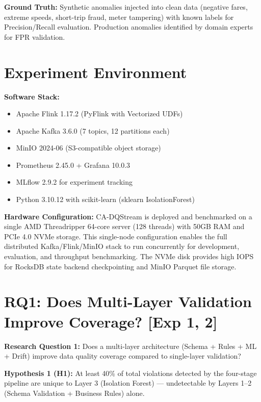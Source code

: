 \textbf{Ground Truth:} Synthetic anomalies injected into clean data (negative fares, extreme speeds, short-trip fraud, meter tampering) with known labels for Precision/Recall evaluation. Production anomalies identified by domain experts for FPR validation.

\section{Experiment Environment}

\textbf{Software Stack:}
\begin{itemize}
    \item Apache Flink 1.17.2 (PyFlink with Vectorized UDFs)
    \item Apache Kafka 3.6.0 (7 topics, 12 partitions each)
    \item MinIO 2024-06 (S3-compatible object storage)
    \item Prometheus 2.45.0 + Grafana 10.0.3
    \item MLflow 2.9.2 for experiment tracking
    \item Python 3.10.12 with scikit-learn (sklearn IsolationForest)
\end{itemize}

\textbf{Hardware Configuration:}
CA-DQStream is deployed and benchmarked on a single AMD Threadripper 64-core server (128 threads) with 50GB RAM and PCIe 4.0 NVMe storage. This single-node configuration enables the full distributed Kafka/Flink/MinIO stack to run concurrently for development, evaluation, and throughput benchmarking. The NVMe disk provides high IOPS for RocksDB state backend checkpointing and MinIO Parquet file storage.

\section{RQ1: Does Multi-Layer Validation Improve Coverage? [Exp 1, 2]}

\textbf{Research Question 1:} Does a multi-layer architecture (Schema + Rules + ML + Drift) improve data quality coverage compared to single-layer validation?

\textbf{Hypothesis 1 (H1):} At least 40\% of total violations detected by the four-stage pipeline are unique to Layer 3 (Isolation Forest) --- undetectable by Layers 1--2 (Schema Validation + Business Rules) alone.

